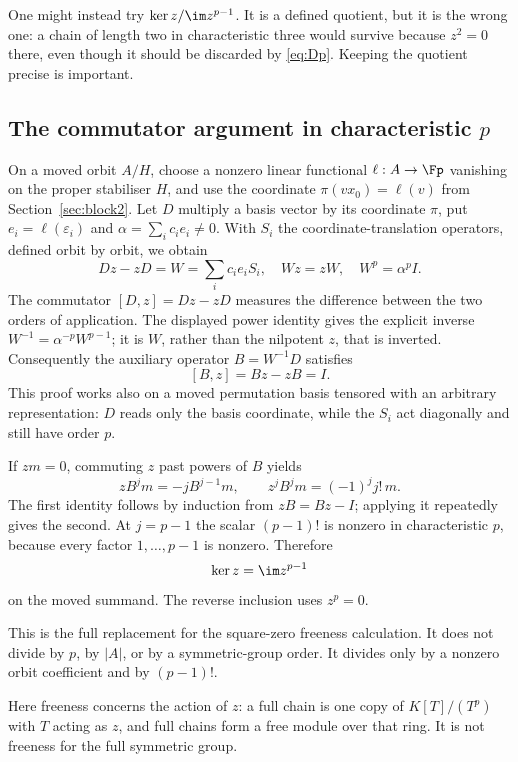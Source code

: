One might instead try $\ker z/\im z^{p-1}$. It is a defined quotient, but it is the wrong one: a chain of length two in characteristic three would survive because $z^2=0$ there, even though it should be discarded by \eqref{eq:Dp}. Keeping the quotient precise is important.

\subsection{The commutator argument in characteristic \texorpdfstring{$p$}{p}}\label{sec:commutatorp}
On a moved orbit $A/H$, choose a nonzero linear functional $\ell:A\to\Fp$ vanishing on the proper stabiliser $H$, and use the coordinate $\pi(vx_0)=\ell(v)$ from Section~\ref{sec:block2}. Let $D$ multiply a basis vector by its coordinate $\pi$, put $e_i=\ell(\varepsilon_i)$ and $\alpha=\sum_i c_ie_i\ne0$. With $S_i$ the coordinate-translation operators, defined orbit by orbit, we obtain
\[Dz-zD=W=\sum_i c_ie_iS_i,\quad Wz=zW,\quad W^p=\alpha^pI.
\]
The commutator $[D,z]=Dz-zD$ measures the difference between the
two orders of application. The displayed power identity gives the
explicit inverse $W^{-1}=\alpha^{-p}W^{p-1}$; it is $W$, rather
than the nilpotent $z$, that is inverted.
Consequently the auxiliary operator $B=W^{-1}D$ satisfies
\begin{equation}\label{eq:commutator}[B,z]=Bz-zB=I.\end{equation}
This proof works also on a moved permutation basis tensored with an arbitrary representation: $D$ reads only the basis coordinate, while the $S_i$ act diagonally and still have order $p$.

If $zm=0$, commuting $z$ past powers of $B$ yields
\[zB^jm=-jB^{j-1}m,
\qquad z^jB^jm=(-1)^jj!\,m.
\]
The first identity follows by induction from $zB=Bz-I$; applying it repeatedly gives the second. At $j=p-1$ the scalar $(p-1)!$ is nonzero in characteristic $p$, because every factor $1,\ldots,p-1$ is nonzero. Therefore
\begin{equation}\label{eq:freep}\ker z=\im z^{p-1}
\end{equation}
on the moved summand. The reverse inclusion uses $z^p=0$.

This is the full replacement for the square-zero freeness calculation. It does not divide by $p$, by $|A|$, or by a symmetric-group order. It divides only by a nonzero orbit coefficient and by $(p-1)!$.

Here freeness concerns the action of $z$: a full chain is one copy of
$K[T]/(T^p)$ with $T$ acting as $z$, and full chains form a free
module over that ring. It is not freeness for the full symmetric group.

